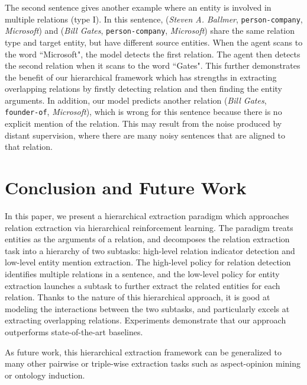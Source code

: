 \documentclass[letterpaper]{article} %
\theoremstyle{definition}
\begin{document}
The second sentence gives another example where an entity is involved in multiple relations (type I). In this sentence, (\textit{Steven A. Ballmer}, \texttt{person-company}, \textit{Microsoft}) and (\textit{Bill Gates}, \texttt{person-company}, \textit{Microsoft}) share the same relation type and target entity, but have different source entities. When the agent scans to the word ``Microsoft", the model detects the first relation. The agent then detects the second relation when it scans to the word ``Gates". This further demonstrates the benefit of our hierarchical framework which has strengths in extracting overlapping relations by firstly detecting relation and then finding the entity arguments.
In addition, our model predicts another relation (\textit{Bill Gates}, \texttt{founder-of}, \textit{Microsoft}), which is wrong for this sentence because there is no explicit mention of the relation. This may result from the noise produced by distant supervision, where there are many noisy sentences that are aligned to that relation.

\section{Conclusion and Future Work}
In this paper, we present a hierarchical extraction paradigm which approaches relation extraction via hierarchical reinforcement learning.
The paradigm treats entities as the arguments of a relation, and decomposes the relation extraction task into a hierarchy of two subtasks: high-level relation indicator detection and low-level entity mention extraction. The high-level policy for relation detection identifies multiple relations in a sentence, and the low-level policy for entity extraction launches a subtask to further extract the related entities for each relation.
Thanks to the nature of this hierarchical approach, it is good at modeling the interactions between the two subtasks, and particularly excels at extracting overlapping relations.
Experiments demonstrate that our approach outperforms state-of-the-art baselines.

As future work, this hierarchical extraction framework can be generalized to many other pairwise or triple-wise extraction tasks such as aspect-opinion mining or ontology induction.
\end{document}
